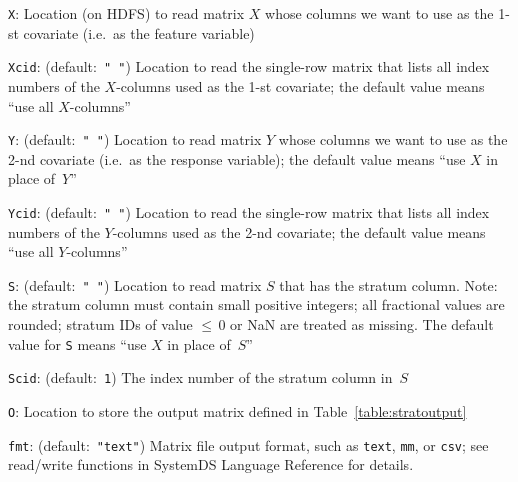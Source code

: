 \smallskip
{}
\begin{Description}
\item[{\tt X}:]
Location (on HDFS) to read matrix $X$ whose columns we want to use as
the 1-st covariate (i.e.~as the feature variable)
\item[{\tt Xcid}:] (default:\mbox{ }{\tt " "})
Location to read the single-row matrix that lists all index numbers
of the $X$-columns used as the 1-st covariate; the default value means
``use all $X$-columns''
\item[{\tt Y}:] (default:\mbox{ }{\tt " "})
Location to read matrix $Y$ whose columns we want to use as the 2-nd
covariate (i.e.~as the response variable); the default value means
``use $X$ in place of~$Y$''
\item[{\tt Ycid}:] (default:\mbox{ }{\tt " "})
Location to read the single-row matrix that lists all index numbers
of the $Y$-columns used as the 2-nd covariate; the default value means
``use all $Y$-columns''
\item[{\tt S}:] (default:\mbox{ }{\tt " "})
Location to read matrix $S$ that has the stratum column.
Note: the stratum column must contain small positive integers; all fractional
values are rounded; stratum IDs of value ${\leq}\,0$ or NaN are treated as
missing.  The default value for {\tt S} means ``use $X$ in place of~$S$''
\item[{\tt Scid}:] (default:\mbox{ }{\tt 1})
The index number of the stratum column in~$S$
\item[{\tt O}:]
Location to store the output matrix defined in Table~\ref{table:stratoutput}
\item[{\tt fmt}:] (default:\mbox{ }{\tt "text"})
Matrix file output format, such as {\tt text}, {\tt mm}, or {\tt csv};
see read/write functions in SystemDS Language Reference for details.
\end{Description}


